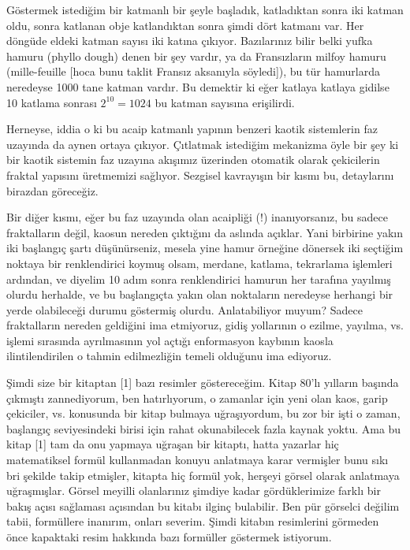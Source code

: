 \documentclass[12pt,fleqn]{article}\usepackage{../../common}
\begin{document}
Göstermek istediğim bir katmanlı bir şeyle başladık, katladıktan sonra iki
katman oldu, sonra katlanan obje katlandıktan sonra şimdi dört katmanı var. Her
döngüde eldeki katman sayısı iki katına çıkıyor. Bazılarınız bilir belki yufka
hamuru (phyllo dough) denen bir şey vardır, ya da Fransızların milfoy hamuru
(mille-feuille [hoca bunu taklit Fransız aksanıyla söyledi]), bu tür hamurlarda
neredeyse 1000 tane katman vardır. Bu demektir ki eğer katlaya katlaya gidilse
10 katlama sonrası $2^{10} = 1024$ bu katman sayısına erişilirdi.

Herneyse, iddia o ki bu acaip katmanlı yapının benzeri kaotik sistemlerin faz
uzayında da aynen ortaya çıkıyor. Çıtlatmak istediğim mekanizma öyle bir şey ki
bir kaotik sistemin faz uzayına akışımız üzerinden otomatik olarak çekicilerin
fraktal yapısını üretmemizi sağlıyor. Sezgisel kavrayışın bir kısmı bu,
detaylarını birazdan göreceğiz.

Bir diğer kısmı, eğer bu faz uzayında olan acaipliği (!) inanıyorsanız, bu
sadece fraktalların değil, kaosun nereden çıktığını da aslında açıklar. Yani
birbirine yakın iki başlangıç şartı düşünürseniz, mesela yine hamur örneğine
dönersek iki seçtiğim noktaya bir renklendirici koymuş olsam, merdane, katlama,
tekrarlama işlemleri ardından, ve diyelim 10 adım sonra renklendirici hamurun
her tarafına yayılmış olurdu herhalde, ve bu başlangıçta yakın olan noktaların
neredeyse herhangi bir yerde olabileceği durumu göstermiş olurdu. Anlatabiliyor
muyum? Sadece fraktalların nereden geldiğini ima etmiyoruz, gidiş yollarının
o ezilme, yayılma, vs. işlemi sırasında ayrılmasının yol açtığı enformasyon
kaybının kaosla ilintilendirilen o tahmin edilmezliğin temeli olduğunu ima
ediyoruz. 

Şimdi size bir kitaptan [1] bazı resimler göstereceğim. Kitap 80'lı
yılların başında çıkmıştı zannediyorum, ben hatırlıyorum, o zamanlar için
yeni olan kaos, garip çekiciler, vs. konusunda bir kitap bulmaya
uğraşıyordum, bu zor bir işti o zaman, başlangıç seviyesindeki birisi için
rahat okunabilecek fazla kaynak yoktu. Ama bu kitap [1] tam da onu yapmaya
uğraşan bir kitaptı, hatta yazarlar hiç matematiksel formül kullanmadan
konuyu anlatmaya karar vermişler bunu sıkı bri şekilde takip etmişler,
kitapta hiç formül yok, herşeyi görsel olarak anlatmaya uğraşmışlar. Görsel
meyilli olanlarınız şimdiye kadar gördüklerimize farklı bir bakış açısı
sağlaması açısından bu kitabı ilginç bulabilir. Ben pür görselci değilim
tabii, formüllere inanırım, onları severim. Şimdi kitabın resimlerini
görmeden önce kapaktaki resim hakkında bazı formüller göstermek istiyorum.
\end{document}
